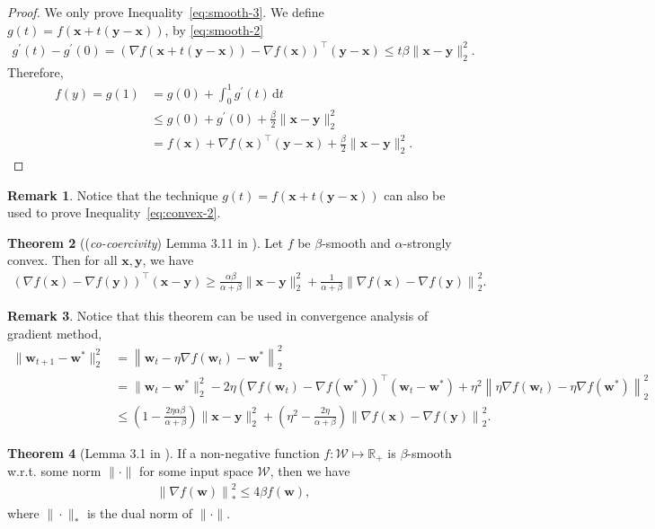 \documentclass[twoside,11pt]{article}
\newcommand{\intd}{\, \mathrm{d}}
\newcommand{\w}{\boldsymbol{w}}
\newcommand{\x}{\boldsymbol{x}}
\newcommand{\y}{\boldsymbol{y}}
\newcommand{\0}{\boldsymbol{0}}
\theoremstyle{definition}
\newtheorem{theorem}{Theorem}[section]
\newtheorem{remark}[theorem]{Remark}
\begin{document}
\begin{proof} We only prove Inequality~\eqref{eq:smooth-3}. We define $g(t)=f(\x+t(\y-\x))$, by \eqref{eq:smooth-2}
\begin{align*}
g^{\prime}(t)-g^{\prime}(0)=(\nabla f(\x+t(\y-\x))-\nabla f(\x))^\top(\y-\x) \leq t \beta \|\x-\y\|^{2}_2.
\end{align*}
Therefore,
\begin{align*}
f(y)=g(1) &=g(0)+\int_{0}^{1} g^{\prime}(t) \intd t \\
&\leq g(0)+g^{\prime}(0)+\frac{\beta}{2}\|\x-\y\|^{2}_2 \\
&=f(\x)+\nabla f(\x)^\top(\y-\x)+\frac{\beta}{2}\|\x-\y\|^{2}_2.
\end{align*}
\end{proof}
\begin{remark}Notice that the technique $g(t)=f(\x+t(\y-\x))$ can also be used to prove Inequality~\eqref{eq:convex-2}.
\end{remark}

\begin{theorem}[(\emph{co-coercivity}) Lemma 3.11 in \cite{bubeck2014convex}] Let $f$ be $\beta$-smooth and $\alpha$-strongly convex. Then for all $\x,\y$, we have
\begin{align}
\label{eq:co-coercivity}
\left(\nabla f(\x) - \nabla f(\y) \right)^\top (\x - \y) \geq \frac{\alpha \beta}{\alpha+\beta} \| \x - \y \|_2^2 + \frac{1}{\alpha + \beta}  \left \| \nabla f(\x) - \nabla f(\y) \right\|_2^2.
\end{align}
\end{theorem}
\begin{remark} Notice that this theorem can be used in convergence analysis of gradient method,
\begin{align*}
\| \w_{t+1} - \w^*\|_2^2 &= \left \| \w_{t} - \eta \nabla f(\w_t) - \w^* \right\|_2^2 \\
&= \| \w_{t} - \w^* \|^2_2 - 2 \eta \left(\nabla f(\w_t) - \nabla f(\w^*)\right)^\top (\w_t - \w^*) + \eta^2 \left \| \eta \nabla f(\w_t) - \eta \nabla f(\w^*) \right\|_2^2  \\
&\leq \left(1 - \frac{2 \eta \alpha \beta}{\alpha+\beta}\right) \| \x - \y \|_2^2 + \left(\eta^2 - \frac{2 \eta}{\alpha + \beta}\right)  \left \| \nabla f(\x) - \nabla f(\y) \right\|_2^2.
\end{align*}
\end{remark}

\begin{theorem}[Lemma 3.1 in \cite{srebro2010smoothness}] If a non-negative function $f: \mathcal{W} \mapsto \mathbb{R}_{+}$ is $\beta$-smooth w.r.t. some norm $\| \cdot \|$ for some input space $\mathcal{W}$, then we have
\begin{align}
\label{eq:smooth-gradient}
\left \| \nabla f(\w) \right\|_{*}^2 \leq 4 \beta f(\w),
\end{align}
where $\| \cdot \|_*$ is the dual norm of $\| \cdot \|$.
\end{theorem}
\end{document}
